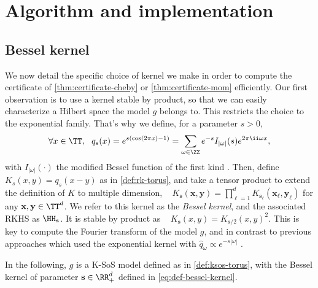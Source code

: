 \documentclass{article}
\begin{document}
\section{Algorithm and implementation}
\label{sec:alg+impl}

\subsection{Bessel kernel}

We now detail the specific choice of kernel we make in order to compute the certificate of \cref{thm:certificate-cheby} or \cref{thm:certificate-mom} efficiently. Our first observation is to use a kernel stable by product, so that we can easily characterize a Hilbert space the model $g$ belongs to. This restricts the choice to the exponential family. That's why we define, for a parameter $s > 0$,
\begin{equation}\label{eq:def-bessel-kernel}
  \forall x \in \TT, ~~ q_s(x) = e^{s (\cos (2\pi x) - 1)} = \sum_{\omega \in \ZZ} e^{-s} I_{|\omega|}(s) e^{2\pi \ii \omega x},
\end{equation}
with $I_{|\omega|}(\cdot)$ the modified Bessel function of the first kind \cite[p.181]{watsonTreatiseTheoryBessel1922}. Then, define $K_s(x, y) = q_s(x - y)$ as in \cref{def:rk-torus}, and take a tensor product to extend the definition of $K$ to multiple dimension, \ie ~ $K_{\mathbf{s}}(\mathbf{x}, \mathbf{y}) = \prod_{\ell = 1}^d K_{\mathbf{s}_\ell}(\mathbf{x}_\ell, \mathbf{y}_\ell)$ for any $\mathbf{x}, \mathbf{y} \in \TT^d$. We refer to this kernel as the \emph{Bessel kernel}, and the associated RKHS as $\HH_\mathbf{s}$. It is stable by product as ~ $K_\mathbf{s}(x, y) = K_{\mathbf{s}/2}(x, y)^2$. This is key to compute the Fourier transform of the model $g$, and in contrast to previous approaches which used the exponential kernel with $\hat{q}_\omega \propto e^{-s |\omega|}$ \cite{woodworthNonConvexOptimizationCertificates2022,bachExponentialConvergenceSumofsquares2023}.

In the following, $g$ is a K-SoS model defined as in \cref{def:ksos-torus}, with the Bessel kernel of parameter $\mathbf{s} \in \RR_+^d$ defined in \cref{eq:def-bessel-kernel}.
\end{document}
